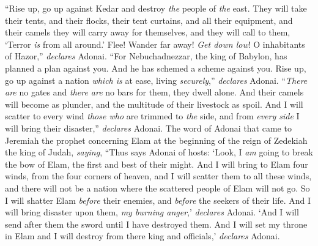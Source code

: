 \begin{biblechapter}
\verse “Rise up, go up against Kedar 
and destroy \textit{the} people of \textit{the} east.
\verse They will take their tents, and their flocks, 
their tent curtains, and all their equipment, 
and their camels they will carry away for themselves, 
and they will call to them, ‘Terror \textit{is} from all around.’
\verse Flee! Wander far away! \textit{Get down low}! 
O inhabitants of Hazor,” \textit{declares} Adonai. 
“For Nebuchadnezzar, the king of Babylon, has planned a plan against you. 
And he has schemed a scheme against you.
\verse Rise up, go up against a nation \textit{which is} at ease, 
living \textit{securely},” \textit{declares} Adonai. 
“\textit{There are} no gates and \textit{there are} no bars for them, 
they dwell alone.
\verse And their camels will become as plunder, 
and the multitude of their livestock as spoil. 
And I will scatter to every wind \textit{those who} are trimmed to \textit{the} side, 
and from \textit{every side} I will bring their disaster,” \textit{declares} Adonai.
 The word of Adonai that came to Jeremiah the prophet concerning Elam at the beginning of the reign of Zedekiah the king of Judah, \textit{saying},
\verse “Thus says Adonai of hosts:
\verse ‘Look, I \textit{am} going to break the bow of Elam, 
the first and best of their might.
\verse And I will bring to Elam four winds, 
from the four corners of heaven, 
and I will scatter them to all these winds, 
and there will not be a nation 
where the scattered people of Elam will not go.
\verse So I will shatter Elam \textit{before} their enemies, 
and \textit{before} the seekers of their life. 
And I will bring disaster upon them, 
\textit{my burning anger},’ \textit{declares} Adonai. 
‘And I will send after them the sword 
until I have destroyed them.
\verse And I will set my throne in Elam 
and I will destroy from there king and officials,’ \textit{declares} Adonai.
\end{biblechapter}

